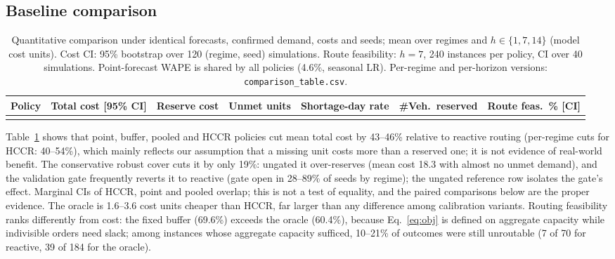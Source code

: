 \documentclass[conference]{IEEEtran}
\begin{document}
\subsection{Baseline comparison}
\begin{table}[t]\centering\caption{Quantitative comparison under identical forecasts, confirmed demand, costs and seeds; mean over regimes and $h\in\{1,7,14\}$ (model cost units). Cost CI: 95\% bootstrap over 120 (regime, seed) simulations. Route feasibility: $h{=}7$, 240 instances per policy, CI over 40 simulations. Point-forecast WAPE is shared by all policies (4.6\%, seasonal LR). Per-regime and per-horizon versions: \texttt{comparison\_table.csv}.}\label{tab:pol}
\footnotesize\setlength{\tabcolsep}{4pt}
\begin{tabular}{lcrrrrc}\toprule
Policy & Total cost [95\% CI] & Reserve cost & Unmet units & Shortage-day rate & \#Veh.\ reserved & Route feas.\ \% [CI]\\\midrule
\\\bottomrule
\end{tabular}\end{table}
Table~\ref{tab:pol} shows that point, buffer, pooled and HCCR policies cut mean total cost by 43--46\% relative to reactive routing (per-regime cuts for HCCR: 40--54\%), which mainly reflects our assumption that a missing unit costs more than a reserved one; it is not evidence of real-world benefit. The conservative robust cover cuts it by only 19\%: ungated it over-reserves (mean cost 18.3 with almost no unmet demand), and the validation gate frequently reverts it to reactive (gate open in 28--89\% of seeds by regime); the ungated reference row isolates the gate's effect. Marginal CIs of HCCR, point and pooled overlap; this is not a test of equality, and the paired comparisons below are the proper evidence. The oracle is 1.6--3.6 cost units cheaper than HCCR, far larger than any difference among calibration variants. Routing feasibility ranks differently from cost: the fixed buffer (69.6\%) exceeds the oracle (60.4\%), because Eq.~\eqref{eq:obj} is defined on aggregate capacity while indivisible orders need slack; among instances whose aggregate capacity sufficed, 10--21\% of outcomes were still unroutable (7 of 70 for reactive, 39 of 184 for the oracle).
\end{document}
